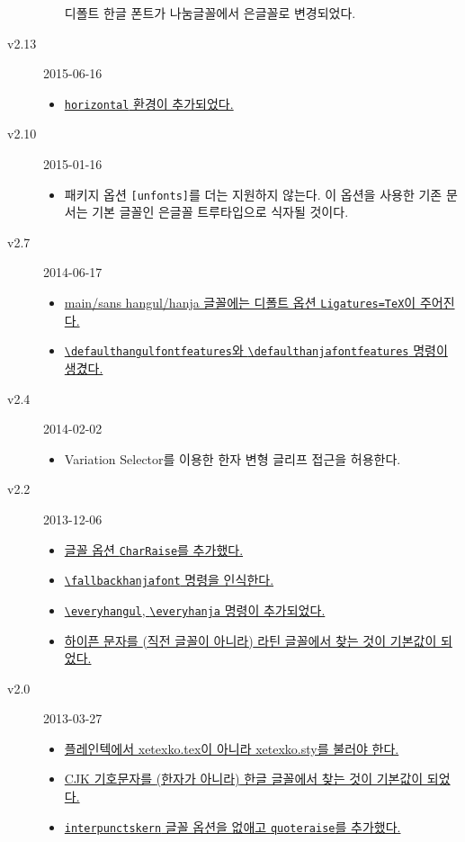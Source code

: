 \documentclass[a4paper]{article}
\def\cs#1{\texttt{\textbackslash #1}}
\def\hparen#1{{\small\hangulparens(#1)}}
\begin{document}
\begin{small}
\begin{description}
\begin{itemize}
          {디폴트 한글 폰트가 나눔글꼴에서 은글꼴로 변경되었다.}
      \end{itemize}
    \item[v2.13] 2015-06-16
      \begin{itemize}
        \item \hyperref[sec:verttype]
          {\texttt{horizontal} 환경이 추가되었다.}
      \end{itemize}
    \item[v2.10] 2015-01-16
      \begin{itemize}
        \item 패키지 옵션 \texttt{[unfonts]}를 더는 지원하지 않는다. 이 옵션을
          사용한 기존 문서는 기본 글꼴인 은글꼴 트루타입으로 식자될 것이다.
      \end{itemize}
    \item[v2.7] 2014-06-17
      \begin{itemize}
        \item \hyperref[sec:fontcmds]
          {main/sans hangul/hanja 글꼴에는 디폴트 옵션
          \texttt{Ligatures=TeX}이 주어진다.}
        \item \hyperref[sec:fontopts]
          {\cs{defaulthangulfontfeatures}와 \cs{defaulthanjafontfeatures}
          명령이 생겼다.}
      \end{itemize}
    \item[v2.4] 2014-02-02
      \begin{itemize}
        \item Variation Selector를 이용한 한자 변형 글리프 접근을 허용한다.
      \end{itemize}
    \item[v2.2] 2013-12-06
      \begin{itemize}
        \item \hyperref[sec:fontopts]
          {글꼴 옵션 \texttt{CharRaise}를 추가했다.}
        \item \hyperref[sec:fontcmds]
          {\cs{fallbackhanjafont} 명령을 인식한다.}
        \item \hyperref[sec:etccmds]
          {\cs{everyhangul}, \cs{everyhanja} 명령이 추가되었다.}
        \item \hyperref[sec:symbolfont]
          {하이픈 문자를 \hparen{직전 글꼴이 아니라} 라틴 글꼴에서 찾는
          것이 기본값이 되었다.}
      \end{itemize}
    \item[v2.0] 2013-03-27
      \begin{itemize}
        \item \hyperref[sec:loading]
          {플레인텍에서 xetexko.tex이 아니라 xetexko.sty를 불러야 한다.}
        \item \hyperref[sec:symbolfont]
          {CJK 기호문자를 \hparen{한자가 아니라} 한글 글꼴에서 찾는 것이
          기본값이 되었다.}
        \item \hyperref[sec:fontopts]
          {\texttt{interpunctskern} 글꼴 옵션을 없애고 \texttt{quoteraise}를
          추가했다.}
      \end{itemize}
  \end{description}
\end{small}
\end{document}
